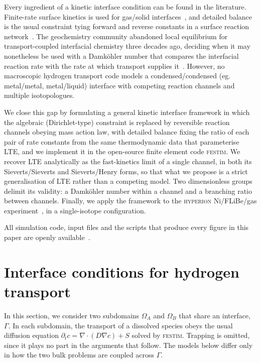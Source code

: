 \documentclass[5p]{elsarticle}
\newcommand{\FESTIM}{\textsc{festim}}
\newcommand{\HYPERION}{\textsc{hyperion}}
\begin{document}
Every ingredient of a kinetic interface condition can be found in the literature.
Finite-rate surface kinetics is used for gas/solid interfaces~\cite{ali-khan_rate_1978,pick_model_1985}, and detailed balance is the usual constraint tying forward and reverse constants in a surface reaction network~\cite{mhadeshwar_thermodynamic_2003,gorban_extended_2011}. 
The geochemistry community abandoned local equilibrium for transport-coupled interfacial chemistry three decades ago, deciding when it may nonetheless be used with a Damk\"ohler number that compares the interfacial reaction rate with the rate at which transport supplies it~\cite{knapp_spatial_1989,steefel_coupled_1994}.
However, no macroscopic hydrogen transport code models a condensed/condensed (eg. metal/metal, metal/liquid) interface with competing reaction channels and multiple isotopologues.

We close this gap by formulating a general kinetic interface framework in which the algebraic (Dirichlet-type) constraint is replaced by reversible reaction channels obeying mass action law, with detailed balance fixing the ratio of each pair of rate constants from the same thermodynamic data that parameterise LTE, and we implement it in the open-source finite element code \FESTIM{}.
We recover LTE analytically as the fast-kinetics limit of a single channel, in both its Sieverts/Sieverts and Sieverts/Henry forms, so that what we propose is a strict generalisation of LTE rather than a competing model.
Two dimensionless groups delimit its validity: a Damk\"ohler number within a channel and a branching ratio between channels.
Finally, we apply the framework to the \HYPERION{} Ni/FLiBe/gas experiment~\cite{saraswat_permeation_2026}, in a single-isotope configuration.

All simulation code, input files and the scripts that produce every figure in this paper are openly available~\cite{remi_delaporte_mathurin_2026_22112697}.

\section{Interface conditions for hydrogen transport}
\label{sec:models}

In this section, we consider two subdomains $\Omega_A$ and $\Omega_B$ that share an interface, $\Gamma$.
In each subdomain, the transport of a dissolved species obeys the usual diffusion equation $\partial_t c = \nabla\cdot(D\nabla c) + S$ solved by \FESTIM{}. 
Trapping is omitted, since it plays no part in the arguments that follow.
The models below differ only in how the two bulk problems are coupled across $\Gamma$.
\end{document}
